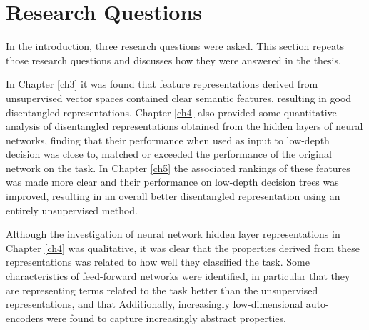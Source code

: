 
\section{Research Questions}

In the introduction, three research questions were asked. This section repeats those research questions and discusses how they were answered in the thesis.


In Chapter \ref{ch3} it was found that feature representations derived from unsupervised vector spaces contained clear semantic features, resulting in good disentangled representations. Chapter \ref{ch4} also provided some quantitative analysis of  disentangled representations obtained from the hidden layers of neural networks, finding that their performance when used as input to low-depth decision  was close to, matched or exceeded the performance of the original network on the task. In Chapter \ref{ch5} the associated rankings of these features was made more clear and their performance on low-depth decision trees was improved, resulting in an overall better disentangled representation using an entirely unsupervised method.


Although the investigation of neural network hidden layer representations in Chapter \ref{ch4} was qualitative, it was clear that the properties derived from these representations was related to how well they classified the task.  Some characteristics of feed-forward networks were identified, in particular that they are representing terms related to the task better than the unsupervised representations, and that  Additionally, increasingly low-dimensional auto-encoders were found to capture increasingly abstract properties.

